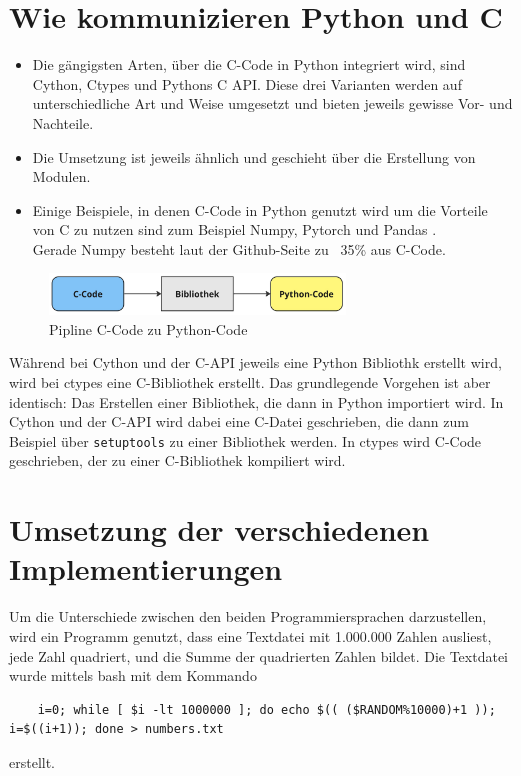 \documentclass[a4paper, parskip=half]{scrartcl}
\begin{document}
\section{Wie kommunizieren Python und C}

\begin{itemize}
    \item Die gängigsten Arten, über die C-Code in Python integriert wird, sind
    Cython, Ctypes und Pythons C API. Diese drei Varianten werden auf unterschiedliche Art und Weise umgesetzt und bieten jeweils gewisse Vor- und Nachteile.
    \item Die Umsetzung ist jeweils ähnlich und geschieht über die Erstellung von Modulen. 
    \item Einige Beispiele, in denen C-Code in Python genutzt wird um die Vorteile von C zu nutzen sind zum Beispiel Numpy\cite{numpy}, Pytorch \cite{pytorch} und Pandas \cite{pandas}.\\
    Gerade Numpy besteht laut der Github-Seite zu ~35\% aus C-Code.   
\end{itemize}

\begin{figure}[H]
    \centering
    \includegraphics[width=0.7\textwidth]{pipeline.jpg}
    \caption{Pipline C-Code zu Python-Code}
    \label{fig:pipeline}
\end{figure}

Während bei Cython und der C-API jeweils eine Python Bibliothk erstellt wird, wird bei ctypes eine C-Bibliothek erstellt. Das grundlegende Vorgehen ist aber identisch: Das Erstellen einer Bibliothek, die dann in Python importiert wird. 
In Cython und der C-API wird dabei eine C-Datei geschrieben, die dann zum Beispiel über \lstinline{setuptools} zu einer Bibliothek werden.
In ctypes wird C-Code geschrieben, der zu einer C-Bibliothek kompiliert wird. 


\section{Umsetzung der verschiedenen Implementierungen}
Um die Unterschiede zwischen den beiden Programmiersprachen darzustellen, wird ein Programm genutzt, dass eine Textdatei mit 1.000.000 Zahlen ausliest, jede Zahl quadriert, und die Summe der quadrierten Zahlen bildet. 
Die Textdatei wurde mittels bash mit dem Kommando 
\begin{lstlisting}
    i=0; while [ $i -lt 1000000 ]; do echo $(( ($RANDOM%10000)+1 )); i=$((i+1)); done > numbers.txt
\end{lstlisting}
erstellt.     
\end{document}
